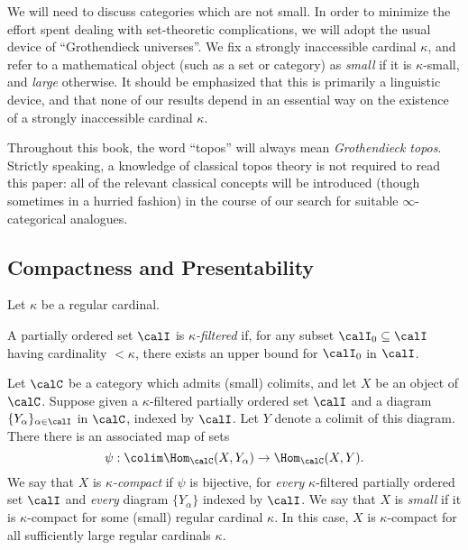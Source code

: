We will need to discuss categories which are not small. In order to minimize the effort spent dealing with set-theoretic complications, we will adopt the usual device of ``Grothendieck universes''. We fix a strongly inaccessible cardinal $\kappa$, and refer to a mathematical object (such as a set or category) as {\it small} if it is $\kappa$-small, and {\it large} otherwise.
It should be emphasized that this is primarily a linguistic device, and that none of our results depend in an essential way on the existence of a strongly inaccessible cardinal $\kappa$.

Throughout this book, the word ``topos'' will always mean {\em Grothendieck topos}. Strictly speaking, a knowledge of classical topos theory is not required to read this paper: all of the relevant classical concepts will be introduced (though sometimes in a hurried fashion) in the course of our search for suitable $\infty$-categorical analogues. 

\subsection{Compactness and Presentability}

Let $\kappa$ be a regular cardinal.

\begin{definition}
A partially ordered set $\calI$ is {\it $\kappa$-filtered} if, for any subset $\calI_0 \subseteq \calI$ having cardinality $< \kappa$, there exists an upper bound for $\calI_0$ in $\calI$.
\end{definition}

Let $\calC$ be a category which admits (small) colimits, and 
let $X$ be an object of $\calC$.
Suppose given a $\kappa$-filtered partially ordered set $\calI$ and a diagram $\{Y_{\alpha} \}_{\alpha \in \calI}$ in $\calC$, indexed by $\calI$. Let $Y$ denote a colimit of this diagram.
There there is an associated map of sets
$$ \psi: \colim \Hom_{\calC}(X, Y_{\alpha}) \rightarrow \Hom_{\calC}(X,Y).$$
We say that $X$ is {\it $\kappa$-compact} if $\psi$ is bijective, for {\em every} $\kappa$-filtered
partially ordered set $\calI$ and {\em every} diagram $\{ Y_{\alpha} \}$ indexed by $\calI$.
We say that $X$ is {\it small} if it is $\kappa$-compact for some (small) regular cardinal $\kappa$.
In this case, $X$ is $\kappa$-compact for all sufficiently large regular cardinals $\kappa$.

